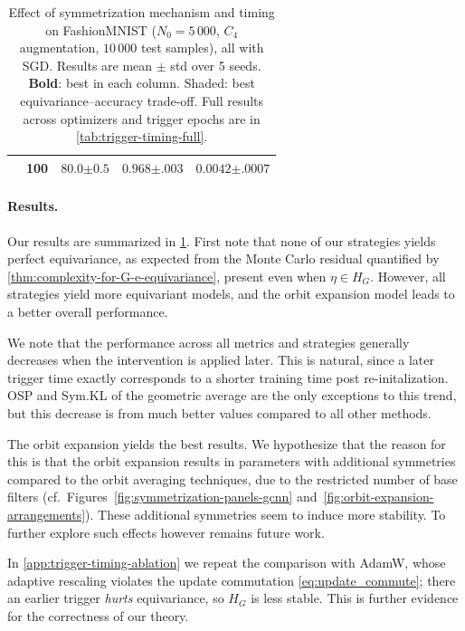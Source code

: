\documentclass{article}
\begin{document}
\begin{table}
\begin{tabular}{@{}ll ccc@{}}
      & \cellcolor{gray!15}100 & \cellcolor{gray!15}$80.0{\scriptstyle\pm0.5}$ & \cellcolor{gray!15}$\mathbf{0.968}{\scriptstyle\pm.003}$ & \cellcolor{gray!15}$\mathbf{0.0042}{\scriptstyle\pm.0007}$ \\
    \bottomrule
    \end{tabular}
    \caption{Effect of symmetrization mechanism and timing on FashionMNIST
    ($N_{0} = 5\,000$, $C_4$ augmentation, $10\,000$ test samples), all with SGD.
    Results are mean $\pm$ std over 5 seeds.
    \textbf{Bold}: best in each column.
    \colorbox{gray!15}{Shaded}: best equivariance--accuracy trade-off.
    Full results across optimizers and trigger epochs are in \cref{tab:trigger-timing-full}.}
    \label{tab:symmetrization-comparison}
    \vspace{-1cm}
\end{table}
\paragraph{Results.} Our results are summarized in \cref{tab:symmetrization-comparison}.
First note  that none of our strategies yields perfect equivariance, as expected from the 
Monte Carlo residual quantified by \cref{thm:complexity-for-G-e-equivariance}, present even when $\eta \in H_G$. However, all strategies yield more equivariant models, and the orbit expansion model leads to a better overall performance.

We note that the performance across all metrics and strategies generally decreases when the intervention is applied later. This is natural, since a later trigger time exactly corresponds to a shorter training time post re-initalization. OSP and Sym.KL of the geometric average are the only exceptions to this trend, but this decrease is from much better values
compared to all other methods. 

The orbit expansion yields the best results. We hypothesize that the reason for this is that the orbit expansion results in parameters with additional symmetries compared to the orbit averaging techniques, due to the restricted number of base filters (cf.\ Figures~\ref{fig:symmetrization-panels-gcnn} and~\ref{fig:orbit-expansion-arrangements}).
These additional symmetries seem to induce more stability. To further explore such effects however remains future work.


In \cref{app:trigger-timing-ablation} we repeat the comparison with AdamW, whose adaptive rescaling violates the update commutation \eqref{eq:update_commute}; there an earlier trigger \emph{hurts} equivariance, so $H_{G}$ is less stable. This is further evidence for the correctness of our theory.
\end{document}
